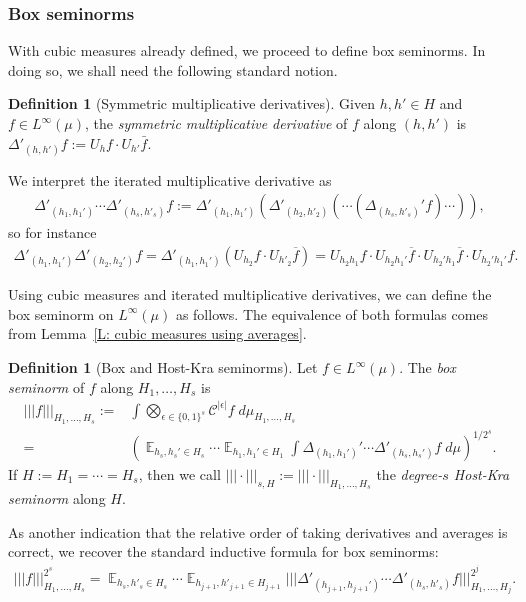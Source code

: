 \documentclass[11pt]{amsart}
\theoremstyle{definition}
\newtheorem{definition}[lemma]{Definition}
\DeclareMathOperator*{\E}{\mathbb{E}}
\newcommand{\CC}{{\mathcal C}}
\newcommand{\eps}{\epsilon}
\newcommand{\nnorm}[1]{\lvert\!|\!| #1|\!|\!\rvert}
\newcommand{\1}{{\mathbf{1}}}
\newcommand{\brac}[1]{\mathopen{}\left( #1 \mathclose{}\right)}
\begin{document}
\subsubsection{Box seminorms}
With cubic measures {already defined,} we proceed to define box seminorms. In doing so, we shall need the following standard notion.
\begin{definition}[Symmetric multiplicative derivatives]
    Given $h,h'\in H$ and $f\in L^\infty(\mu)$, the \textit{symmetric multiplicative derivative} of $f$ along $(h,h')$ is $\Delta'_{(h,h')}f:=U_h f\cdot U_{h'}\bar f$.
\end{definition}
We interpret {the} iterated multiplicative derivative as
\begin{align*}
    \Delta'_{(h_1,h_1')}\cdots \Delta'_{(h_s,h'_s)}f:=\Delta'_{(h_1,h_1')}(\Delta'_{(h_2,h'_2)}(\cdots (\Delta_{(h_s,h'_s)}' f)\cdots)),
\end{align*}
so for instance
\begin{align*}
    \Delta'_{(h_1,h_1')}\Delta'_{(h_2,h_2')}f = \Delta'_{(h_1,h_1')}(U_{h_2}f\cdot U_{h'_2}\overline{f}) = U_{h_2 h_1}f\cdot U_{h_2 h_1'}\overline{f}\cdot U_{h_2' h_1}\overline{f}\cdot U_{h_2' h_1'}f.
\end{align*}

Using cubic measures and iterated multiplicative derivatives, we can define the box seminorm on $L^\infty(\mu)$ as follows. The equivalence of both formulas comes from Lemma~\ref{L: cubic measures using averages}.

\begin{definition}[Box and Host-Kra seminorms]\label{D: box seminorms}
    Let $f\in L^\infty(\mu)$. The \textit{box seminorm} of $f$ along $H_1, \ldots, H_s$ is
    \begin{align*}
        \nnorm{f}_{H_1, \ldots, H_s} :=&\int \bigotimes_{\eps\in\{0,1\}^s}\CC^{|\eps|}f\; d\mu_{H_1, \ldots, H_s}\\
    =&\brac{\E_{h_s,h_s'\in H_s}\cdots \E_{h_1,h_1'\in H_1}\int \Delta_{(h_1,h_1')}'\cdots \Delta'_{(h_s,h_s')}f\; d\mu}^{1/2^s}.
    \end{align*}
{If $H:=H_1 = \cdots = H_s$, then we call $\nnorm{\cdot}_{s,H}:=\nnorm{\cdot}_{H_1, \ldots, H_s}$ the \textit{degree-$s$ Host-Kra seminorm} along $H$.} 
\end{definition}

As another indication that the relative order of taking derivatives and averages is correct, we recover the standard inductive formula for box seminorms:
\begin{align}\label{E: inductive formula}
    \nnorm{f}_{H_1, \ldots, H_s}^{2^s} = \E_{h_s,h'_s\in H_s}\cdots \E_{h_{j+1},h'_{j+1}\in H_{j+1}}\nnorm{\Delta'_{(h_{j+1},h_{j+1}')}\cdots \Delta'_{(h_s,h'_s)}f}_{H_1, \ldots, H_j}^{2^j}.
\end{align}
\end{document}
